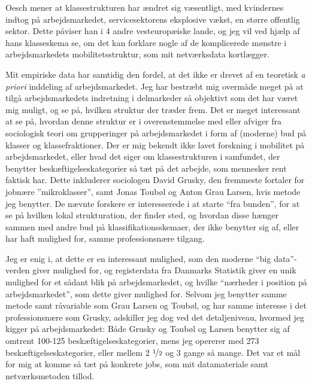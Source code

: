 Oesch mener at klassestrukturen har ændret sig væsentligt, med kvindernes indtog på arbejdsmarkedet, servicesektorens eksplosive vækst, en større offentlig sektor. Dette påviser han i 4 andre vesteuropæiske lande, og jeg vil ved hjælp af hans klasseskema se, om det kan forklare nogle af de komplicerede mønstre i arbejdsmarkedets mobilitetsstruktur, som mit netværksdata kortlægger. 

Mit empiriske data har samtidig den fordel, at det ikke er drevet af en teoretisk \emph{a priori} inddeling af arbejdsmarkedet. Jeg har bestræbt mig overmåde meget på at tilgå arbejdsmarkedets indretning i delmarkeder så objektivt som det har været mig muligt, og se på, hvilken struktur der træder frem. Det er meget interessant at se på, hvordan denne struktur er i overenstemmelse med eller afviger fra  sociologisk teori om grupperinger på arbejdsmarkedet i form af (moderne) bud på klasser og klassefraktioner. Der er mig bekendt ikke lavet forskning i mobilitet på arbejdsmarkedet, eller hvad det siger om klassestrukturen i samfundet, der benytter beskæftigelseskategorier så tæt på det arbejde, som mennesker rent faktisk har. Dette inkluderer sociologen David Grusky, den fremmeste fortaler for jobnære ”mikroklasser”, samt Jonas Toubøl og Anton Grau Larsen, hvis metode jeg benytter. De nævnte forskere er interesserede i at starte “fra bunden”, for at se på hvilken lokal strukturation, der finder sted, og hvordan disse hænger sammen med andre bud på klassifikationsskemaer, der ikke benytter sig af, eller har haft mulighed for, samme professionsnære tilgang. 

Jeg er enig i, at dette er en interessant mulighed, som den moderne “big data”-verden giver mulighed for, og registerdata fra Danmarks Statistik giver en unik mulighed for et sådant blik på arbejdsmarkedet, og hvilke “nærheder i position på arbejdsmarkedet”, som dette giver mulighed for. Selvom jeg benytter samme metode samt råvariable som Grau Larsen og Toubøl, og har samme interesse i det professionsnære som Grusky, adskiller jeg dog ved det detaljeniveau, hvormed jeg kigger på arbejdsmarkedet:  Både Grusky \citeyear{Grusky2012} og Toubøl og Larsen \citeyear{TouboelLarsen2017} benytter sig af omtrent 100-125 beskæftigelseskategorier, mens jeg opererer med 273 beskæftigelseskategorier, eller mellem 2 $\nicefrac{1}{2}$ og 3 gange så mange. Det var et mål for mig at komme så tæt på konkrete jobs, som mit datamateriale samt netværksmetoden tillod.  

